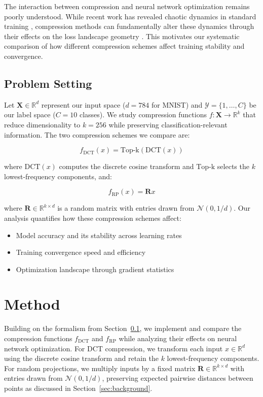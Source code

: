\documentclass{article} %
\begin{document}
The interaction between compression and neural network optimization remains poorly understood. While recent work has revealed chaotic dynamics in standard training \citep{Herrmann2022ChaoticDA}, compression methods can fundamentally alter these dynamics through their effects on the loss landscape geometry \citep{Horoi2021ExploringTG}. This motivates our systematic comparison of how different compression schemes affect training stability and convergence.

\subsection{Problem Setting}
\label{subsec:problem}
Let $\mathbf{X} \in \mathbb{R}^{d}$ represent our input space ($d=784$ for MNIST) and $\mathcal{Y} = \{1,\ldots,C\}$ be our label space ($C=10$ classes). We study compression functions $f\colon \mathbf{X} \rightarrow \mathbb{R}^{k}$ that reduce dimensionality to $k=256$ while preserving classification-relevant information. The two compression schemes we compare are:

\begin{equation}
\label{eq:dct}
    f_{\text{DCT}}(x) = \text{Top-k}(\text{DCT}(x))
\end{equation}

where $\text{DCT}(x)$ computes the discrete cosine transform and $\text{Top-k}$ selects the $k$ lowest-frequency components, and:

\begin{equation}
\label{eq:rp}
    f_{\text{RP}}(x) = \mathbf{R}x
\end{equation}

where $\mathbf{R} \in \mathbb{R}^{k \times d}$ is a random matrix with entries drawn from $\mathcal{N}(0,1/d)$. Our analysis quantifies how these compression schemes affect:
\begin{itemize}
    \item Model accuracy and its stability across learning rates
    \item Training convergence speed and efficiency 
    \item Optimization landscape through gradient statistics
\end{itemize}

\section{Method}
\label{sec:method}

Building on the formalism from Section~\ref{subsec:problem}, we implement and compare the compression functions $f_{\text{DCT}}$ and $f_{\text{RP}}$ while analyzing their effects on neural network optimization. For DCT compression, we transform each input $x \in \mathbb{R}^d$ using the discrete cosine transform and retain the $k$ lowest-frequency components. For random projections, we multiply inputs by a fixed matrix $\mathbf{R} \in \mathbb{R}^{k \times d}$ with entries drawn from $\mathcal{N}(0,1/d)$, preserving expected pairwise distances between points as discussed in Section~\ref{sec:background}.
\end{document}
